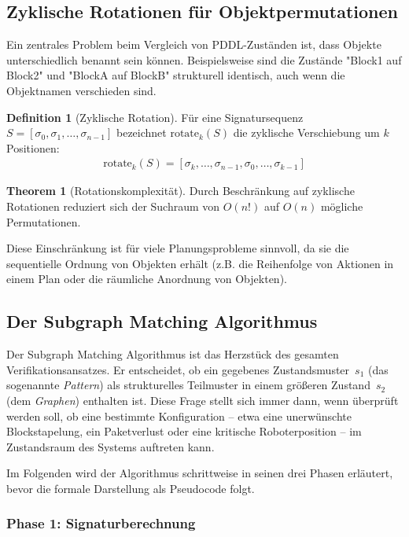 ﻿\documentclass[a4paper,12pt]{article}
\theoremstyle{definition}
\newtheorem{definition}{Definition}[section]
\newtheorem{theorem}{Theorem}[section]
\begin{document}
\subsection{Zyklische Rotationen für Objektpermutationen}

Ein zentrales Problem beim Vergleich von PDDL-Zuständen ist, dass Objekte unterschiedlich benannt sein können. Beispielsweise sind die Zustände "Block1 auf Block2" und "BlockA auf BlockB" strukturell identisch, auch wenn die Objektnamen verschieden sind.

\begin{definition}[Zyklische Rotation]
	Für eine Signatursequenz $S = [\sigma_0, \sigma_1, \ldots, \sigma_{n-1}]$
	bezeichnet $\text{rotate}_k(S)$ die zyklische Verschiebung um $k$ Positionen:
	\begin{align}
	\text{rotate}_k(S) = [\sigma_k, \ldots, \sigma_{n-1}, \sigma_0, \ldots, \sigma_{k-1}]
	\end{align}
\end{definition}

\begin{theorem}[Rotationskomplexität]
	Durch Beschränkung auf zyklische Rotationen reduziert sich der Suchraum von $O(n!)$ auf $O(n)$ mögliche Permutationen.
\end{theorem}

Diese Einschränkung ist für viele Planungsprobleme sinnvoll, da sie die sequentielle Ordnung von Objekten erhält (z.B. die Reihenfolge von Aktionen in einem Plan oder die räumliche Anordnung von Objekten).

\subsection{Der Subgraph Matching Algorithmus}

Der Subgraph Matching Algorithmus ist das Herzstück des gesamten Verifikationsansatzes. Er entscheidet, ob ein gegebenes Zustandsmuster~$s_1$ (das sogenannte \emph{Pattern}) als strukturelles Teilmuster in einem größeren Zustand~$s_2$ (dem \emph{Graphen}) enthalten ist. Diese Frage stellt sich immer dann, wenn überprüft werden soll, ob eine bestimmte Konfiguration -- etwa eine unerwünschte Blockstapelung, ein Paketverlust oder eine kritische Roboterposition -- im Zustandsraum des Systems auftreten kann.

Im Folgenden wird der Algorithmus schrittweise in seinen drei Phasen erläutert, bevor die formale Darstellung als Pseudocode folgt.

\subsubsection*{Phase 1: Signaturberechnung}
\end{document}
